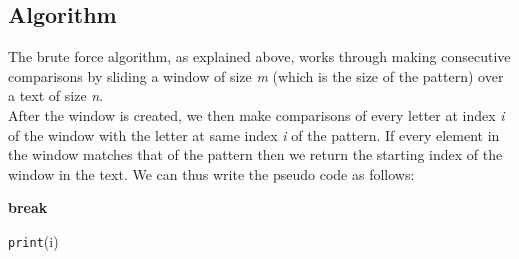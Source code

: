 \documentclass[a4paper, 12pt]{report}
\begin{document}
    \subsection{Algorithm}
    The brute force algorithm, as explained above, works through making consecutive comparisons by sliding a window of size \textit{m} (which is the size of the pattern) over a text of size \textit{n}.\\
    After the window is created, we then make comparisons of every letter at index \textit{i} of the window with the letter at same index \textit{i} of the pattern. If every element in the window matches that of the pattern then we return the starting index of the window in the text.
    We can thus write the pseudo code as follows:
    \newpage
        \begin{algorithm}
\begin{algorithmic}
  \State \textbf{break}
  \EndIf

  \State \texttt{print}(i)
  \EndIf
  \EndFor
  \EndFor
  
\EndProcedure
\end{algorithmic}
\end{algorithm}
\end{document}
